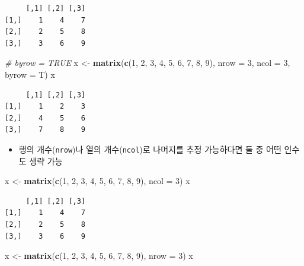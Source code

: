 \documentclass[
  11pt,
]{krantz}
\newenvironment{Shaded}{\begin{snugshade}}{\end{snugshade}}
\newcommand{\CommentTok}[1]{\textcolor[rgb]{0.37,0.37,0.37}{\textit{#1}}}
\newcommand{\DataTypeTok}[1]{\textcolor[rgb]{0.27,0.27,0.27}{#1}}
\newcommand{\DecValTok}[1]{\textcolor[rgb]{0.06,0.06,0.06}{#1}}
\newcommand{\KeywordTok}[1]{\textcolor[rgb]{0.27,0.27,0.27}{\textbf{#1}}}
\newcommand{\NormalTok}[1]{#1}
\newcommand{\StringTok}[1]{\textcolor[rgb]{0.5,0.5,0.5}{#1}}
\providecommand{\tightlist}{%
  \setlength{\itemsep}{0pt}\setlength{\parskip}{0pt}}
\begin{document}
\begin{verbatim}
     [,1] [,2] [,3]
[1,]    1    4    7
[2,]    2    5    8
[3,]    3    6    9
\end{verbatim}

\begin{Shaded}
\begin{Highlighting}[]
\CommentTok{# byrow = TRUE}
\NormalTok{x <-}\StringTok{ }\KeywordTok{matrix}\NormalTok{(}\KeywordTok{c}\NormalTok{(}\DecValTok{1}\NormalTok{, }\DecValTok{2}\NormalTok{, }\DecValTok{3}\NormalTok{, }\DecValTok{4}\NormalTok{, }\DecValTok{5}\NormalTok{, }\DecValTok{6}\NormalTok{, }\DecValTok{7}\NormalTok{, }\DecValTok{8}\NormalTok{, }\DecValTok{9}\NormalTok{), }\DataTypeTok{nrow =} \DecValTok{3}\NormalTok{, }\DataTypeTok{ncol =} \DecValTok{3}\NormalTok{, }\DataTypeTok{byrow =}\NormalTok{ T)}
\NormalTok{x}
\end{Highlighting}
\end{Shaded}

\begin{verbatim}
     [,1] [,2] [,3]
[1,]    1    2    3
[2,]    4    5    6
[3,]    7    8    9
\end{verbatim}

\normalsize

\begin{itemize}
\tightlist
\item
  행의 개수(\texttt{nrow})나 열의 개수(\texttt{ncol})로 나머지를 추정 가능하다면 둘 중 어떤 인수도 생략 가능
\end{itemize}

\footnotesize

\begin{Shaded}
\begin{Highlighting}[]
\NormalTok{x <-}\StringTok{ }\KeywordTok{matrix}\NormalTok{(}\KeywordTok{c}\NormalTok{(}\DecValTok{1}\NormalTok{, }\DecValTok{2}\NormalTok{, }\DecValTok{3}\NormalTok{, }\DecValTok{4}\NormalTok{, }\DecValTok{5}\NormalTok{, }\DecValTok{6}\NormalTok{, }\DecValTok{7}\NormalTok{, }\DecValTok{8}\NormalTok{, }\DecValTok{9}\NormalTok{), }\DataTypeTok{ncol =} \DecValTok{3}\NormalTok{)}
\NormalTok{x}
\end{Highlighting}
\end{Shaded}

\begin{verbatim}
     [,1] [,2] [,3]
[1,]    1    4    7
[2,]    2    5    8
[3,]    3    6    9
\end{verbatim}

\begin{Shaded}
\begin{Highlighting}[]
\NormalTok{x <-}\StringTok{ }\KeywordTok{matrix}\NormalTok{(}\KeywordTok{c}\NormalTok{(}\DecValTok{1}\NormalTok{, }\DecValTok{2}\NormalTok{, }\DecValTok{3}\NormalTok{, }\DecValTok{4}\NormalTok{, }\DecValTok{5}\NormalTok{, }\DecValTok{6}\NormalTok{, }\DecValTok{7}\NormalTok{, }\DecValTok{8}\NormalTok{, }\DecValTok{9}\NormalTok{), }\DataTypeTok{nrow =} \DecValTok{3}\NormalTok{)}
\NormalTok{x}
\end{Highlighting}
\end{Shaded}
\end{document}
